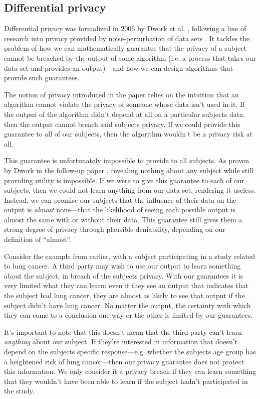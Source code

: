 \documentclass[12pt]{article}
\begin{document}
\subsection{Differential privacy \label{sec:promise}}

Differential privacy was formalized in 2006 by Dwork et al. \cite{dworketal2006}, following a line of research into privacy provided by noise-perturbation of data sets \cite{precursor_2003,precursor_2004,precusor_2005}. It tackles the problem of how we can mathematically guarantee that the privacy of a subject cannot be breached by the output of some algorithm (i.e. a process that takes our data set and provides an output)---and how we can design algorithms that provide such guarantees.

The notion of privacy introduced in the paper relies on the intuition that an algorithm cannot violate the privacy of someone whose data isn't used in it. If the output of the algorithm didn't depend at all on a particular subjects data, then the output cannot breach said subjects privacy. If we could provide this guarantee to all of our subjects, then the algorithm wouldn't be a privacy risk at all.

This guarantee is unfortunately impossible to provide to all subjects. As proven by Dwork in the follow-up paper \cite{dwork2006_diffpriv}, revealing nothing about any subject while still providing utility is impossible. If we were to give this guarantee to each of our subjects, then we could not learn anything from our data set, rendering it useless. Instead, we can promise our subjects that the influence of their data on the output is \emph{almost} none---that the likelihood of seeing each possible output is almost the same with or without their data. This guarantee still gives them a strong degree of privacy through plausible deniability, depending on our definition of ``almost''. \bigskip

Consider the example from earlier, with a subject participating in a study related to lung cancer. A third party may wish to use our output to learn something about the subject, in breach of the subjects privacy. With our guarantees it is very limited what they can learn: even if they see an output that indicates that the subject had lung cancer, they are almost as likely to see that output if the subject didn't have lung cancer. No matter the output, the certainty with which they can come to a conclusion one way or the other is limited by our guarantees.

It's important to note that this doesn't mean that the third party can't learn \emph{anything} about our subject. If they're interested in information that doesn't depend on the subjects specific response---e.g. whether the subjects age group has a heightened risk of lung cancer---then our privacy guarantee does not protect this information. We only consider it a privacy breach if they can learn something that they wouldn't have been able to learn if the subject hadn't participated in the study. \bigskip
\end{document}
